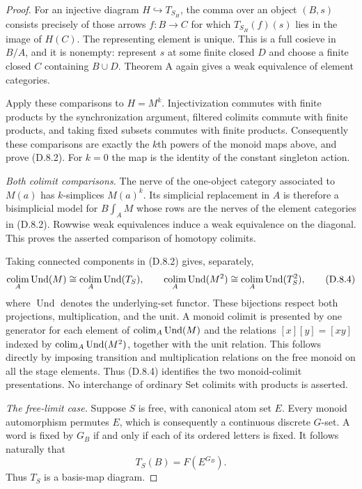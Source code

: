 \begin{proof}
For an injective diagram $H\hookrightarrow T_{S_H}$, the comma
over an object $(B,s)$ consists precisely of those arrows
$f:B\to C$ for which $T_{S_H}(f)(s)$ lies in the image of $H(C)$.
The representing element is unique. This is a full cosieve in
$B/A$, and it is nonempty: represent $s$ at some finite closed
$D$ and choose a finite closed $C$ containing $B\cup D$.
Theorem A again gives a weak equivalence of element categories.

Apply these comparisons to $H=M^k$. Injectivization commutes with
finite products by the synchronization argument, filtered colimits
commute with finite products, and taking fixed subsets commutes
with finite products. Consequently these comparisons are exactly
the $k$th powers of the monoid maps above, and prove (D.8.2).
For $k=0$ the map is the identity of the constant singleton action.

\emph{Both colimit comparisons.}
The nerve of the one-object category associated to $M(a)$ has
$k$-simplices $M(a)^k$. Its simplicial replacement in $A$ is
therefore a bisimplicial model for $B\int_A M$ whose rows are
the nerves of the element categories in (D.8.2). Rowwise weak
equivalences induce a weak equivalence on the diagonal. This
proves the asserted comparison of homotopy colimits.

Taking connected components in (D.8.2) gives, separately,
\[
 \operatorname*{colim}_A \operatorname{Und}(M)\cong\operatorname*{colim}_A \operatorname{Und}(T_S),\qquad
 \operatorname*{colim}_A \operatorname{Und}(M^2)\cong\operatorname*{colim}_A \operatorname{Und}(T_S^2),
 \tag{D.8.4}
\]
where $\operatorname{Und}$ denotes the underlying-set functor. These bijections
respect both projections, multiplication, and the unit. A monoid
colimit is presented by one generator for each element of
$\operatorname*{colim}_A \operatorname{Und}(M)$ and the relations $[x][y]=[xy]$ indexed by
$\operatorname*{colim}_A \operatorname{Und}(M^2)$, together with the unit relation. This follows
directly by imposing transition and multiplication relations on
the free monoid on all the stage elements. Thus (D.8.4) identifies
the two monoid-colimit presentations. No interchange of ordinary
Set colimits with products is asserted.

\emph{The free-limit case.}
Suppose $S$ is free, with canonical atom set $E$. Every monoid
automorphism permutes $E$, which is consequently a continuous
discrete $G$-set. A word is fixed by $G_B$ if and only if each
of its ordered letters is fixed. It follows naturally that
\[
                  T_S(B)=F(E^{G_B}).
 \tag{D.8.5}
\]
Thus $T_S$ is a basis-map diagram.


\end{proof}
